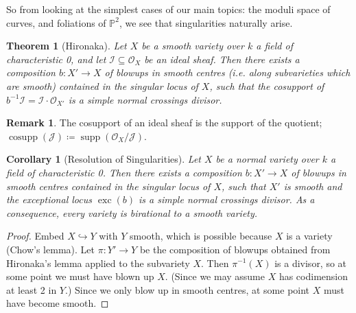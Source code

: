 \documentclass{article}
\newtheorem*{theorem}{Theorem}
\newtheorem*{corollary}{Corollary}
\theoremstyle{definition}
\newtheorem*{remark}{Remark}
\DeclareMathOperator{\exc}{exc}
\DeclareMathOperator{\supp}{supp}
\DeclareMathOperator{\cosupp}{cosupp}
\newcommand{\I}{\mathscr{I}}
\newcommand{\J}{\mathscr{J}}
\renewcommand{\O}{\mathcal{O}}
\renewcommand{\P}{\mathbb{P}}
\begin{document}
So from looking at the simplest cases of our main topics: the moduli space of
curves, and foliations of $\P^2$, we see that singularities naturally arise.

\begin{theorem}[Hironaka]
    Let $X$ be a smooth variety over $k$ a field of characteristic 0, and let
    $\I\subseteq\O_X$ be an ideal sheaf. Then there exists a composition
    $b:X'\to X$ of blowups in smooth centres (i.e. along subvarieties which are
    smooth) contained in the singular locus of $X$, such that the cosupport of
    $b^{-1}\I=\I\cdot\O_{X'}$ is a simple normal crossings divisor.
\end{theorem}

\begin{remark}
    The cosupport of an ideal sheaf is the support of the quotient;
    $\cosupp(\J)\coloneq\supp(\O_X/\J)$.
\end{remark}

\begin{corollary}[Resolution of Singularities]
    Let $X$ be a normal variety over $k$ a field of characteristic 0. Then there
    exists a composition $b:X'\to X$ of blowups in smooth centres contained in
    the singular locus of $X$, such that $X'$ is smooth and the exceptional
    locus $\exc(b)$ is a simple normal crossings divisor. As a consequence,
    every variety is birational to a smooth variety.
\end{corollary}

\begin{proof}
    Embed $X\hookrightarrow Y$ with $Y$ smooth, which is possible because $X$ is
    a variety (Chow's lemma). Let $\pi:Y'\to Y$ be the composition of blowups
    obtained from Hironaka's lemma applied to the subvariety $X$. Then
    $\pi^{-1}(X)$ is a divisor, so at some point we must have blown up $X$.
    (Since we may assume $X$ has codimension at least 2 in $Y$.) Since we only
    blow up in smooth centres, at some point $X$ must have become smooth.
\end{proof}
\end{document}
